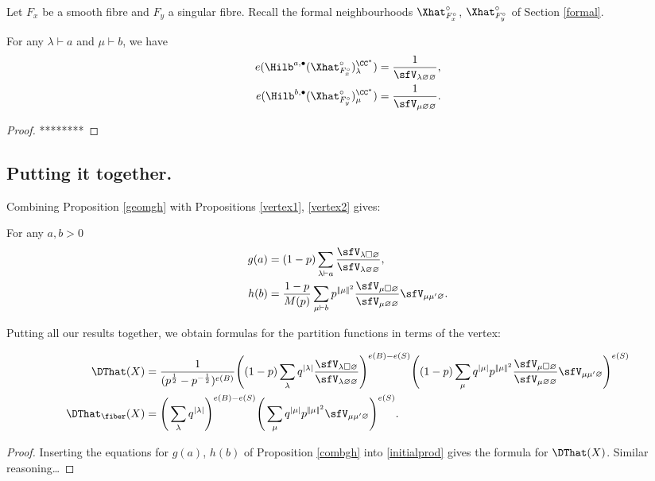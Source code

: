 Let $F_x$ be a smooth fibre and $F_y$ a singular fibre. Recall the
formal neighbourhoods $\Xhat ^{\circ}_{F_{x}^{\circ}}$, $\Xhat
^{\circ}_{F_{y}^{\circ}}$ of Section \ref{formal}.
\begin{proposition} \label{vertex2}
For any $\lambda \vdash a$ and $\mu \vdash b$, we have
\begin{align*}
e(\Hilb^{a,\bullet}(\Xhat ^{\circ}_{F_{x}^{\circ}})_{\lambda}^{\CC^*}) &= \frac{1}{\sfV_{\lambda\varnothing\varnothing}}, \\
e(\Hilb^{b,\bullet}(\Xhat ^{\circ}_{F_{y}^{\circ}})_{\mu}^{\CC^*}) &= \frac{1}{\sfV_{\mu\varnothing\varnothing}}.
\end{align*}
\end{proposition}
\begin{proof}
********
\end{proof}   

\subsection{Putting it together.}

Combining Proposition \ref{geomgh} with Propositions \ref{vertex1}, \ref{vertex2} gives:
\begin{proposition} \label{combgh}
For any $a,b>0$ 
\begin{align}
\begin{split} \label{gh}
g(a) &= (1-p) \sum_{\lambda \vdash a} \frac{\sfV_{\lambda\square\varnothing}}{\sfV_{\lambda\varnothing\varnothing}}, \\
h(b) &= \frac{1-p}{M(p)} \sum_{\mu \vdash b} p^{|\!|\mu|\!|^2} \frac{\sfV_{\mu\square\varnothing}}{\sfV_{\mu\varnothing\varnothing}} \sfV_{\mu\mu'\varnothing}.
\end{split}
\end{align}
\end{proposition}

Putting all our results together, we obtain formulas for the partition
functions in terms of the vertex: 
\begin{theorem} \label{thm: Zhat in terms of vertex}
\begin{align*}
\DThat (X)& = \frac{1}{(p^{\frac{1}{2}} - p^{-\frac{1}{2}})^{e(B)}} \Bigg( (1-p) \sum_{\lambda} q^{|\lambda|} \frac{\sfV_{\lambda\square\varnothing}}{\sfV_{\lambda\varnothing\varnothing}} \Bigg)^{e(B) - e(S)}  \Bigg( (1-p) \sum_{\mu}  q^{|\mu|} p^{|\!|\mu|\!|^2} \frac{\sfV_{\mu\square\varnothing}}{\sfV_{\mu\varnothing\varnothing}} \sfV_{\mu\mu'\varnothing} \Bigg)^{e(S)} \\
\DThat_{\fiber}(X)&= \Bigg( \sum_{\lambda} q^{|\lambda|} \Bigg)^{e(B) - e(S)} \Bigg( \sum_{\mu} q^{|\mu|} p^{|\!|\mu|\!|^2} \sfV_{\mu\mu'\varnothing} \Bigg)^{e(S)}.
\end{align*}
\end{theorem}
\begin{proof}
Inserting the equations for $g(a)$, $h(b)$ of Proposition \ref{combgh}
into \eqref{initialprod} gives the formula for $\DThat (X)$. Similar
reasoning\dots {}
\end{proof}

